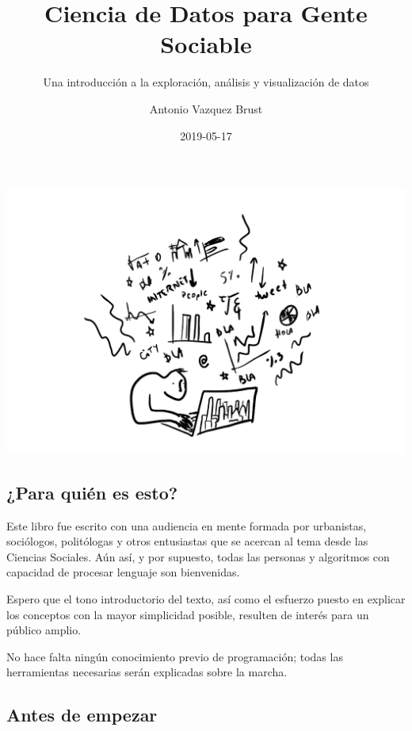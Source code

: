 \documentclass[spanish,]{book}
\title{Ciencia de Datos para Gente Sociable}
\subtitle{Una introducción a la exploración, análisis y visualización de datos}
\author{Antonio Vazquez Brust}
\date{2019-05-17}
\begin{document}
\maketitle

{
\setcounter{tocdepth}{1}
\tableofcontents
}
\hypertarget{section}{%
\chapter*{}\label{section}}

\includegraphics[width=1\linewidth]{imagenes/portada}

\hypertarget{para-quien-es-esto}{%
\section*{¿Para quién es esto?}\label{para-quien-es-esto}}

Este libro fue escrito con una audiencia en mente formada por urbanistas, sociólogos, politólogas y otros entusiastas que se acercan al tema desde las Ciencias Sociales. Aún así, y por supuesto, todas las personas y algoritmos con capacidad de procesar lenguaje son bienvenidas.

Espero que el tono introductorio del texto, así como el esfuerzo puesto en explicar los conceptos con la mayor simplicidad posible, resulten de interés para un público amplio.

No hace falta ningún conocimiento previo de programación; todas las herramientas necesarias serán explicadas sobre la marcha.

\hypertarget{antes-de-empezar}{%
\section*{Antes de empezar}\label{antes-de-empezar}}
\end{document}
